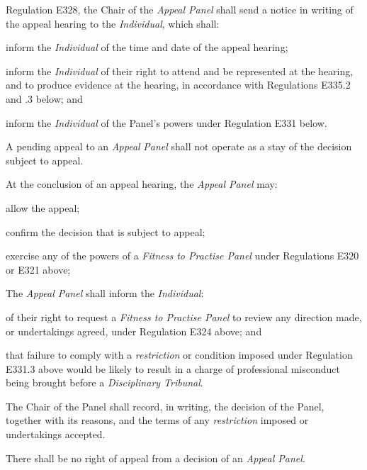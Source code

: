 Regulation E328, the Chair of the \emph{Appeal Panel} shall send a
notice in writing of the appeal hearing to the \emph{Individual}, which
shall:\\\nl \item inform the \emph{Individual } of the time and date of the appeal
hearing;\item inform the \emph{Individual } of their right to attend and be
represented at the hearing, and to produce evidence at the hearing, in
accordance with Regulations E335.2 and .3 below; and\item inform the \emph{Individual} of the Panel's powers under Regulation
E331 below.\ln
{}\par
A pending appeal to an \emph{Appeal} \emph{Panel} shall not operate as a
stay of the decision subject to appeal.\\
\par
{}
At the conclusion of an appeal hearing, the \emph{Appeal Panel} may:\\\nl \item allow the appeal;\item confirm the decision that is subject to appeal;\item exercise any of the powers of a \emph{Fitness to Practise
Panel} under Regulations E320 or E321 above;\ln
{}\par
The \emph{Appeal Panel} shall inform the \emph{Individual}:\\\nl \item of their right to request a \emph{Fitness to Practise Panel} to
review any direction made, or undertakings agreed, under Regulation E324
above; and\item that failure to comply with a \emph{restriction} or condition imposed
under Regulation E331.3 above would be likely to result in a charge of
professional misconduct being brought before a \emph{Disciplinary
Tribunal}.\ln
{}\par
The Chair of the Panel shall record, in writing, the decision of the
Panel, together with its reasons, and the terms of
any \emph{restriction} imposed or undertakings accepted.\\
\par
There shall be no right of appeal from a decision of an \emph{Appeal
Panel}.\\
\par
